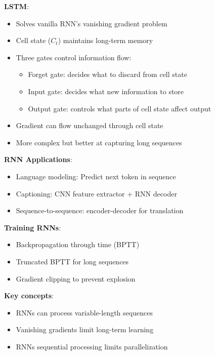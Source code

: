\documentclass{article}
\begin{document}
\begin{multicols}{3}
\textbf{LSTM}:
\begin{itemize}
\item Solves vanilla RNN's vanishing gradient problem
\item Cell state ($C_t$) maintains long-term memory
\item Three gates control information flow:
  \begin{itemize}
  \item Forget gate: decides what to discard from cell state
  \item Input gate: decides what new information to store
  \item Output gate: controls what parts of cell state affect output
  \end{itemize}
\item Gradient can flow unchanged through cell state
\item More complex but better at capturing long sequences
\end{itemize}

\textbf{RNN Applications}:
\begin{itemize}
\item Language modeling: Predict next token in sequence
\item Captioning: CNN feature extractor + RNN decoder
\item Sequence-to-sequence: encoder-decoder for translation
\end{itemize}

\textbf{Training RNNs}:
\begin{itemize}
\item Backpropagation through time (BPTT)
\item Truncated BPTT for long sequences
\item Gradient clipping to prevent explosion
\end{itemize}

\textbf{Key concepts}:
\begin{itemize}
\item RNNs can process variable-length sequences
\item Vanishing gradients limit long-term learning
\item RNNs sequential processing limits parallelization
\end{itemize}


\end{multicols}
\end{document}
